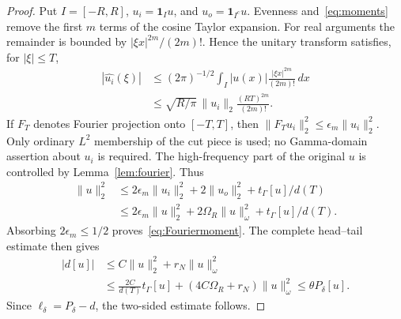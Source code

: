\documentclass[11pt,a4paper]{article}
\numberwithin{equation}{section}
\theoremstyle{remark}
\newcommand{\tg}{t_{\Gamma}}
\newcommand{\norm}[1]{\lVert #1\rVert}
\newcommand{\one}{\mathbf 1}
\begin{document}
\begin{proof}
Put $I=[-R,R]$, $u_i=\one_Iu$, and $u_o=\one_{I^c}u$. Evenness and~\eqref{eq:moments} remove the first $m$ terms of the cosine Taylor expansion. For real arguments the remainder is bounded by $|\xi x|^{2m}/(2m)!$. Hence the unitary transform satisfies, for $|\xi|\le T$,
\begin{align*}
 |\widehat{u_i}(\xi)|
 &\le(2\pi)^{-1/2}\int_I|u(x)|\frac{|\xi x|^{2m}}{(2m)!}\,dx\\
 &\le\sqrt{R/\pi}\,\norm{u_i}_2\frac{(RT)^{2m}}{(2m)!}.
\end{align*}
If $F_T$ denotes Fourier projection onto $[-T,T]$, then
$\norm{F_Tu_i}_2^2\le\epsilon_m\norm{u_i}_2^2$.
Only ordinary $L^2$ membership of the cut piece is used; no Gamma-domain assertion about $u_i$ is required. The high-frequency part of the original $u$ is controlled by Lemma~\ref{lem:fourier}. Thus
\begin{align*}
 \norm u_2^2
 &\le2\epsilon_m\norm{u_i}_2^2+2\norm{u_o}_2^2
                     +\tg[u]/d(T)\\
 &\le2\epsilon_m\norm u_2^2+2\Omega_R\norm u_\omega^2
                     +\tg[u]/d(T).
\end{align*}
Absorbing $2\epsilon_m\le1/2$ proves~\eqref{eq:Fouriermoment}.
The complete head--tail estimate then gives
\begin{align*}
 |d[u]|&\le C\norm u_2^2+r_N\norm u_\omega^2\\
 &\le\frac{2C}{d(T)}\tg[u]+(4C\Omega_R+r_N)\norm u_\omega^2
 \le\theta P_\delta[u].
\end{align*}
Since $\ell_\delta=P_\delta-d$, the two-sided estimate follows.
\end{proof}
\end{document}
